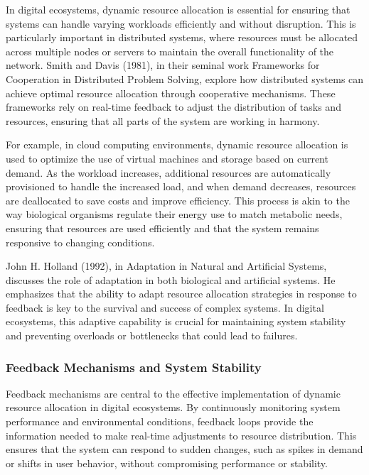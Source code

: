 \documentclass[12pt,twoside]{article}
\begin{document}
In digital ecosystems, dynamic resource allocation is essential for ensuring that systems can handle varying workloads efficiently and without disruption. This is particularly important in distributed systems, where resources must be allocated across multiple nodes or servers to maintain the overall functionality of the network. Smith and Davis (1981), in their seminal work Frameworks for Cooperation in Distributed Problem Solving, explore how distributed systems can achieve optimal resource allocation through cooperative mechanisms. These frameworks rely on real-time feedback to adjust the distribution of tasks and resources, ensuring that all parts of the system are working in harmony.

For example, in cloud computing environments, dynamic resource allocation is used to optimize the use of virtual machines and storage based on current demand. As the workload increases, additional resources are automatically provisioned to handle the increased load, and when demand decreases, resources are deallocated to save costs and improve efficiency. This process is akin to the way biological organisms regulate their energy use to match metabolic needs, ensuring that resources are used efficiently and that the system remains responsive to changing conditions.

John H. Holland (1992), in Adaptation in Natural and Artificial Systems, discusses the role of adaptation in both biological and artificial systems. He emphasizes that the ability to adapt resource allocation strategies in response to feedback is key to the survival and success of complex systems. In digital ecosystems, this adaptive capability is crucial for maintaining system stability and preventing overloads or bottlenecks that could lead to failures.

\subsubsection{Feedback Mechanisms and System Stability}

Feedback mechanisms are central to the effective implementation of dynamic resource allocation in digital ecosystems. By continuously monitoring system performance and environmental conditions, feedback loops provide the information needed to make real-time adjustments to resource distribution. This ensures that the system can respond to sudden changes, such as spikes in demand or shifts in user behavior, without compromising performance or stability.
\end{document}

